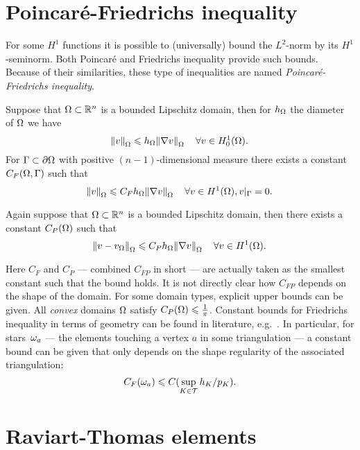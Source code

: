 \documentclass[thesis.tex]{subfiles}
\begin{document}
\section{Poincar\'e-Friedrichs inequality}
\label{sec:poincfried}
For some $H^1$ functions it is possible to (universally) bound the $L^2$-norm by its $H^1$-seminorm.
Both Poincar\'e and Friedrichs inequality provide such bounds. Because of their similarities, these type 
of inequalities are named \emph{Poincar\'e-Friedrichs inequality}.
\begin{thm}
  Suppose that $\Omega \subset \mathbb{R}^n$ is a  bounded Lipschitz domain, then for $h_\Omega$ the diameter of $\Omega$ we have
  \[
    \norm{v}_{\Omega} \leqslant h_\Omega  \norm{\nabla v}_{\Omega} \quad \forall v \in H^1_{0}(\Omega).
  \]
  For $\Gamma \subset \partial \Omega$ with positive $(n-1)$-dimensional measure there exists
  a constant $C_F(\Omega, \Gamma)$ such that
  \[
    \norm{v}_{\Omega} \leqslant C_{F} h_\Omega \norm{\nabla v}_{\Omega} \quad \forall v \in H^1(\Omega), v|_{\Gamma} = 0.
  \]
\end{thm}
\begin{thm}
  Again suppose that $\Omega \subset \mathbb{R}^n$ is a bounded Lipschitz domain, then there exists a constant $C_P(\Omega)$ such that
  \[
    \norm{v - v_{\Omega}}_{\Omega} \leqslant C_Ph_\Omega \norm{\nabla v}_{\Omega} \quad \forall v \in H^1(\Omega).
  \]
\end{thm}
Here $C_F$ and $C_P$ --- combined $C_{FP}$ in short --- are actually taken as the smallest constant such that the bound holds.
It is not directly clear how $C_{FP}$ depends on the shape of the domain. For some domain types, explicit
upper bounds can be given. All \emph{convex} domains $\Omega$  satisfy $C_{P}(\Omega) \leqslant \frac{1}{\pi}$.
Constant bounds for Friedrichs inequality in terms of geometry can be found in literature,
e.g.~\cite{zheng2005friedrichs, veeser2011poincare}. In particular, for stars~$\omega_a$  --- the elements touching
a vertex $a$ in some triangulation --- a constant bound can be given that only depends on the shape regularity of 
the associated triangulation: 
\[C_{F}(\omega_a) \leqslant C(\sup_{K \in \mathcal{T}} h_K / p_K).\]

\section{Raviart-Thomas elements}
\end{document}
